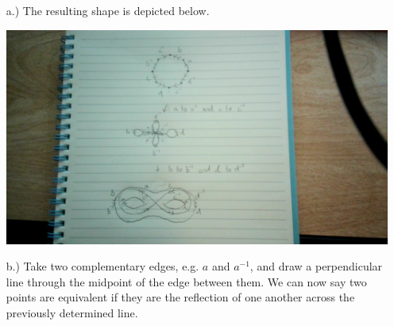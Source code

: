 \documentclass[12pt]{article}
\begin{document}
\begin{itemize}
    \item [a.)] The resulting shape is depicted below.
    \begin{center}
        \includegraphics[scale=0.1]{images/Question2.jpeg}
    \end{center}

    \item [b.)] Take two complementary edges, e.g. $a$ and $a^{-1}$, and draw a perpendicular line through the midpoint of the edge between them. We can now say two points are equivalent if they are the reflection of one another across the previously determined line.
\end{itemize}
\end{document}
